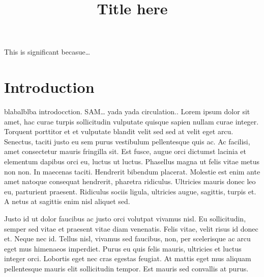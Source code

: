 \documentclass[twocol]{ametsocV5}
\title{Title here}
\affiliation{CIMA UBA blablabla}
\begin{document}
\maketitle


%
%
\statement
This is significant becasue\ldots{}



%

\section{Introduction}

blabalblba introdocction. SAM\ldots{} yada yada circulation.. Lorem
ipsum dolor sit amet, hac curae turpis sollicitudin vulputate quisque
sapien nullam curae integer. Torquent porttitor et et vulputate blandit
velit sed sed at velit eget arcu. Senectus, taciti justo eu sem purus
vestibulum pellentesque quis ac. Ac facilisi, amet consectetur mauris
fringilla sit. Est fusce, augue orci dictumst lacinia et elementum
dapibus orci eu, luctus ut luctus. Phasellus magna ut felis vitae metus
non non. In maecenas taciti. Hendrerit bibendum placerat. Molestie est
enim ante amet natoque consequat hendrerit, pharetra ridiculus.
Ultricies mauris donec leo eu, parturient praesent. Ridiculus sociis
ligula, ultricies augue, sagittis, turpis et. A netus at sagittis enim
nisl aliquet sed.

Justo id ut dolor faucibus ac justo orci volutpat vivamus nisl. Eu
sollicitudin, semper sed vitae et praesent vitae diam venenatis. Felis
vitae, velit risus id donec et. Neque nec id. Tellus nisl, vivamus sed
faucibus, non, per scelerisque ac arcu eget mus himenaeos imperdiet.
Purus eu quis felis mauris, ultricies et luctus integer orci. Lobortis
eget nec cras egestas feugiat. At mattis eget mus aliquam pellentesque
mauris elit sollicitudin tempor. Est mauris sed convallis at purus.
\end{document}
